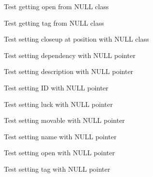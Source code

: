 \begin{DoxyRefList}
%
Test getting open from NULL class  
\item[Global \doxylink{class__test_8c_a3f73499539f350f4cd028b9f4a05ceba}{test2\+\_\+class\+\_\+get\+\_\+tag} ()]\label{test__test000033}%
%
Test getting tag from NULL class  
\item[Global \doxylink{class__test_8c_aed05575e7c0118a2882ae98827935837}{test2\+\_\+class\+\_\+set\+\_\+closeup\+\_\+at\+\_\+pos} ()]\label{test__test000049}%
%
Test setting closeup at position with NULL class  
\item[Global \doxylink{class__test_8c_a382535f9fc18c90c62d73eefeb7dc96f}{test2\+\_\+class\+\_\+set\+\_\+dependency} ()]\label{test__test000057}%
%
Test setting dependency with NULL pointer  
\item[Global \doxylink{class__test_8c_a9e63b08cd1db4396fc90d8e3e8695843}{test2\+\_\+class\+\_\+set\+\_\+desc} ()]\label{test__test000043}%
%
Test setting description with NULL pointer  
\item[Global \doxylink{class__test_8c_a775bdb71b5623bca68914bf9fc186b5e}{test2\+\_\+class\+\_\+set\+\_\+id} ()]\label{test__test000031}%
%
Test setting ID with NULL pointer  
\item[Global \doxylink{class__test_8c_a29f898d9ff717d56edf6cd8a90484050}{test2\+\_\+class\+\_\+set\+\_\+luck} ()]\label{test__test000065}%
%
Test setting luck with NULL pointer  
\item[Global \doxylink{class__test_8c_a907ac10d665ba6cbb8601403be430c1f}{test2\+\_\+class\+\_\+set\+\_\+movable} ()]\label{test__test000053}%
%
Test setting movable with NULL pointer  
\item[Global \doxylink{class__test_8c_ab916776c361e9f290b1bc38746c33dd0}{test2\+\_\+class\+\_\+set\+\_\+name} ()]\label{test__test000039}%
%
Test setting name with NULL pointer  
\item[Global \doxylink{class__test_8c_aeeb4553cf92bad2d319f6145d3887649}{test2\+\_\+class\+\_\+set\+\_\+open} ()]\label{test__test000061}%
%
Test setting open with NULL pointer  
\item[Global \doxylink{class__test_8c_a3c5eb569c41c34241a2864d09be370e1}{test2\+\_\+class\+\_\+set\+\_\+tag} ()]\label{test__test000035}%
%
Test setting tag with NULL pointer  

\end{DoxyRefList}
